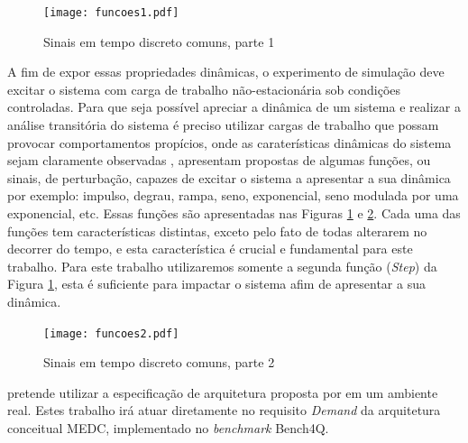 \begin{figure}[!htb]
	\centering
	\texttt{[image: funcoes1.pdf]}
	\caption{Sinais em tempo discreto comuns, parte 1}
	\label{fig:funcoes1}
\end{figure}

A fim de expor essas propriedades dinâmicas, o experimento de simulação deve excitar o sistema com carga de trabalho não-estacionária sob condições controladas. Para que seja possível apreciar a dinâmica de um sistema e realizar a análise transitória do sistema é preciso utilizar cargas de trabalho que possam provocar comportamentos propícios, onde as caraterísticas dinâmicas do sistema sejam claramente observadas , apresentam propostas de algumas funções, ou sinais, de perturbação, capazes de excitar o sistema a apresentar a sua dinâmica por exemplo: impulso, degrau, rampa, seno, exponencial, seno modulada por uma exponencial, etc.  Essas funções são apresentadas nas Figuras \ref{fig:funcoes1} e \ref{fig:funcoes2}. Cada uma das funções tem características distintas, exceto pelo fato de todas alterarem no decorrer do tempo, e esta característica é crucial e fundamental para este trabalho. Para este trabalho utilizaremos somente a segunda função (\textit{Step}) da Figura \ref{fig:funcoes1}, esta é suficiente para impactar o sistema afim de apresentar a sua dinâmica. 

\begin{figure}[!htb]
	\centering
	\texttt{[image: funcoes2.pdf]}
	\caption{Sinais em tempo discreto comuns, parte 2}
	\label{fig:funcoes2}
\end{figure}

 pretende utilizar a especificação de arquitetura proposta por  em um ambiente real. Estes trabalho irá atuar diretamente no requisito \textit{Demand} da arquitetura conceitual MEDC, implementado no \textit{benchmark} Bench4Q.



